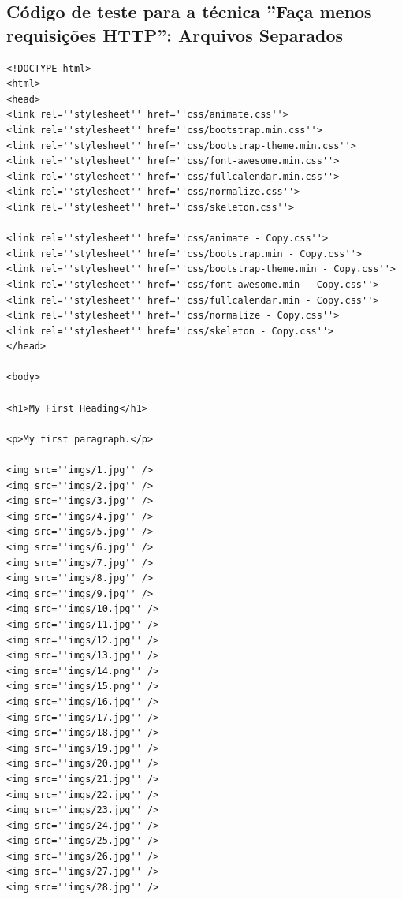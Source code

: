 %
%

\begin{apendicesenv}
\partapendices

\lstset{
	frame=single,
    breaklines=true,
    language=HTML
    }
    
\chapter{Código de teste para a técnica ''Faça menos requisições HTTP'': Arquivos Separados}
\label{apend:codigo_facamenosrequisicoeshttp_sep}

\begin{lstlisting}
<!DOCTYPE html>
<html>
<head>
<link rel=''stylesheet'' href=''css/animate.css''>
<link rel=''stylesheet'' href=''css/bootstrap.min.css''>
<link rel=''stylesheet'' href=''css/bootstrap-theme.min.css''>
<link rel=''stylesheet'' href=''css/font-awesome.min.css''>
<link rel=''stylesheet'' href=''css/fullcalendar.min.css''>
<link rel=''stylesheet'' href=''css/normalize.css''>
<link rel=''stylesheet'' href=''css/skeleton.css''>
	
<link rel=''stylesheet'' href=''css/animate - Copy.css''>
<link rel=''stylesheet'' href=''css/bootstrap.min - Copy.css''>
<link rel=''stylesheet'' href=''css/bootstrap-theme.min - Copy.css''>
<link rel=''stylesheet'' href=''css/font-awesome.min - Copy.css''>
<link rel=''stylesheet'' href=''css/fullcalendar.min - Copy.css''>
<link rel=''stylesheet'' href=''css/normalize - Copy.css''>
<link rel=''stylesheet'' href=''css/skeleton - Copy.css''>
</head>

<body>

<h1>My First Heading</h1>

<p>My first paragraph.</p>

<img src=''imgs/1.jpg'' />
<img src=''imgs/2.jpg'' />
<img src=''imgs/3.jpg'' />
<img src=''imgs/4.jpg'' />
<img src=''imgs/5.jpg'' />
<img src=''imgs/6.jpg'' />
<img src=''imgs/7.jpg'' />
<img src=''imgs/8.jpg'' />
<img src=''imgs/9.jpg'' />
<img src=''imgs/10.jpg'' />
<img src=''imgs/11.jpg'' />
<img src=''imgs/12.jpg'' />
<img src=''imgs/13.jpg'' />
<img src=''imgs/14.png'' />
<img src=''imgs/15.png'' />
<img src=''imgs/16.jpg'' />
<img src=''imgs/17.jpg'' />
<img src=''imgs/18.jpg'' />
<img src=''imgs/19.jpg'' />
<img src=''imgs/20.jpg'' />
<img src=''imgs/21.jpg'' />
<img src=''imgs/22.jpg'' />
<img src=''imgs/23.jpg'' />
<img src=''imgs/24.jpg'' />
<img src=''imgs/25.jpg'' />
<img src=''imgs/26.jpg'' />
<img src=''imgs/27.jpg'' />
<img src=''imgs/28.jpg'' />
	


\end{lstlisting}
\end{apendicesenv}
